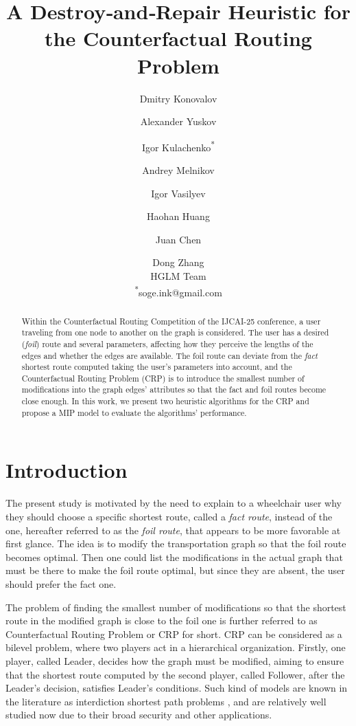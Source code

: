 \documentclass{article}
\title{A Destroy‑and‑Repair Heuristic for the Counterfactual Routing Problem}
\author{
  Dmitry Konovalov \and
  Alexander Yuskov \and
  Igor Kulachenko\textsuperscript{*} \and
  Andrey Melnikov \and
  Igor Vasilyev \and
  Haohan Huang \and
  Juan Chen \and
  Dong Zhang\\
  \affiliations
  HGLM Team \\
  \emails
  \textsuperscript{*}soge.ink@gmail.com
}
\begin{document}
\maketitle

\begin{abstract}
Within the Counterfactual Routing Competition of the IJCAI-25 conference, a user traveling from one node to another on the graph is considered. 
The user has a desired (\textit{foil}) route and several parameters, affecting how they perceive the lengths of the edges and whether the edges are available.
The foil route can deviate from the \textit{fact} shortest route computed taking the user's parameters into account, and the Counterfactual Routing Problem (CRP) is to introduce the smallest number of modifications into the graph edges' attributes so that the fact and foil routes become close enough.
In this work, we present two heuristic algorithms for the CRP and propose a MIP model to evaluate the algorithms' performance.
\end{abstract}

\section{Introduction}

The present study is motivated by the need to explain to a wheelchair user why they should choose a specific shortest route, called a \textit{fact route}, instead of the one, hereafter referred to as the \textit{foil route}, that appears to be more favorable at first glance. 
The idea is to modify the transportation graph so that the foil route becomes optimal.
Then one could list the modifications in the actual graph that must be there to make the foil route optimal, but since they are absent, the user should prefer the fact one.

The problem of finding the smallest number of modifications so that the shortest route in the modified graph is close to the foil one is further referred to as Counterfactual Routing Problem or CRP for short. 
CRP can be considered as a bilevel problem, where two players act in a hierarchical organization.
Firstly, one player, called Leader, decides how the graph must be modified, aiming to ensure that the shortest route computed by the second player, called Follower, after the Leader's decision, satisfies Leader's conditions.
Such kind of models are known in the literature as interdiction shortest path problems \cite{Israeli2002}, and are relatively well studied now due to their broad security and other applications.
\end{document}
